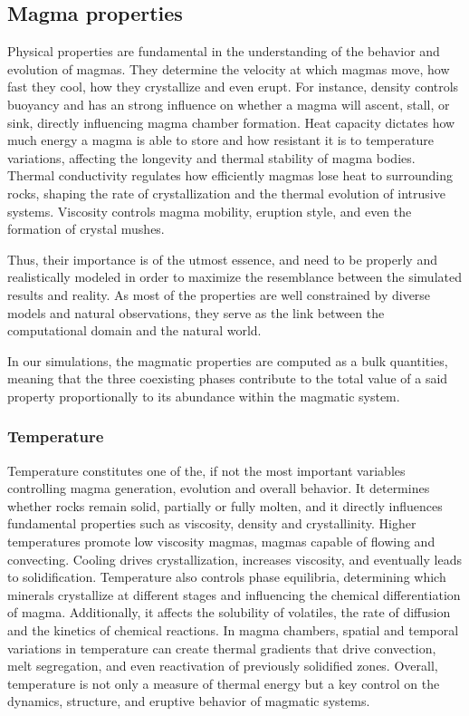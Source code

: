 \subsection{Magma properties}
Physical properties are fundamental in the understanding of the behavior and evolution of magmas. They determine the velocity at which magmas move, how fast they cool, how they crystallize and even erupt. For instance, density controls buoyancy and has an strong influence on whether a magma will ascent, stall, or sink, directly influencing magma chamber formation. Heat capacity dictates how much energy a magma is able to store and how resistant it is to temperature variations, affecting the longevity and thermal stability of magma bodies. Thermal conductivity regulates how efficiently magmas lose heat to surrounding rocks, shaping the rate of crystallization and the thermal evolution of intrusive systems. Viscosity controls magma mobility, eruption style, and even the formation of crystal mushes. 

Thus, their importance is of the utmost essence, and need to be properly and realistically modeled in order to maximize the resemblance between the simulated results and reality.  As most of the properties are well constrained by diverse models and natural observations, they serve as the link between the computational domain and the natural world. 

In our simulations, the magmatic properties are computed as a bulk quantities, meaning that the three coexisting phases contribute to the total value of a said property proportionally to its abundance within the magmatic system.
\subsubsection{Temperature}
Temperature constitutes one of the, if not the most important variables controlling magma generation, evolution and overall behavior. It determines whether rocks remain solid, partially or fully molten, and it directly influences fundamental properties such as viscosity, density and crystallinity. Higher temperatures promote low viscosity magmas, magmas capable of flowing and convecting. Cooling drives crystallization, increases viscosity, and eventually leads to solidification. Temperature also controls phase equilibria, determining which minerals crystallize at different stages and influencing the chemical differentiation of magma. Additionally, it affects the solubility of volatiles, the rate of diffusion and the kinetics of chemical reactions. In magma chambers, spatial and temporal variations in temperature can create thermal gradients that drive convection, melt segregation, and even reactivation of previously solidified zones. Overall, temperature is not only a measure of thermal energy but a key control on the dynamics, structure, and eruptive behavior of magmatic systems.

